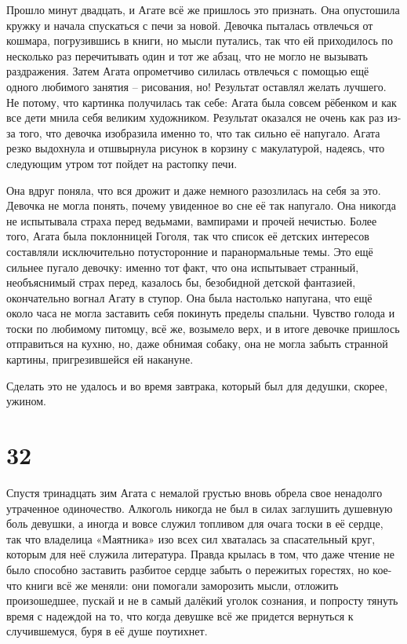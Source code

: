 \documentclass[
  a5paperpaper,
  DIV=11,
  numbers=noendperiod]{scrreprt}
\begin{document}
Прошло минут двадцать, и Агате всё же пришлось это признать. Она
опустошила кружку и начала спускаться с печи за новой. Девочка пыталась
отвлечься от кошмара, погрузившись в книги, но мысли путались, так что
ей приходилось по несколько раз перечитывать один и тот же абзац, что не
могло не вызывать раздражения. Затем Агата опрометчиво силилась
отвлечься с помощью ещё одного любимого занятия -- рисования, но!
Результат оставлял желать лучшего. Не потому, что картинка получилась
так себе: Агата была совсем рёбенком и как все дети мнила себя великим
художником. Результат оказался не очень как раз из-за того, что девочка
изобразила именно то, что так сильно её напугало. Агата резко выдохнула
и отшвырнула рисунок в корзину с макулатурой, надеясь, что следующим
утром тот пойдет на растопку печи.

Она вдруг поняла, что вся дрожит и даже немного разозлилась на себя за
это. Девочка не могла понять, почему увиденное во сне её так напугало.
Она никогда не испытывала страха перед ведьмами, вампирами и прочей
нечистью. Более того, Агата была поклонницей Гоголя, так что список её
детских интересов составляли исключительно потусторонние и
паранормальные темы. Это ещё сильнее пугало девочку: именно тот факт,
что она испытывает странный, необъяснимый страх перед, казалось бы,
безобидной детской фантазией, окончательно вогнал Агату в ступор. Она
была настолько напугана, что ещё около часа не могла заставить себя
покинуть пределы спальни. Чувство голода и тоски по любимому питомцу,
всё же, возымело верх, и в итоге девочке пришлось отправиться на кухню,
но, даже обнимая собаку, она не могла забыть странной картины,
пригрезившейся ей накануне.

Сделать это не удалось и во время завтрака, который был для дедушки,
скорее, ужином.

\section*{32}\label{32}


Спустя тринадцать зим Агата с немалой грустью вновь обрела свое
ненадолго утраченное одиночество. Алкоголь никогда не был в силах
заглушить душевную боль девушки, а иногда и вовсе служил топливом для
очага тоски в её сердце, так что владелица «Маятника» изо всех сил
хваталась за спасательный круг, которым для неё служила литература.
Правда крылась в том, что даже чтение не было способно заставить
разбитое сердце забыть о пережитых горестях, но кое-что книги всё же
меняли: они помогали заморозить мысли, отложить произошедшее, пускай и
не в самый далёкий уголок сознания, и попросту тянуть время с надеждой
на то, что когда девушке всё же придется вернуться к случившемуся, буря
в её душе поутихнет.
\end{document}
